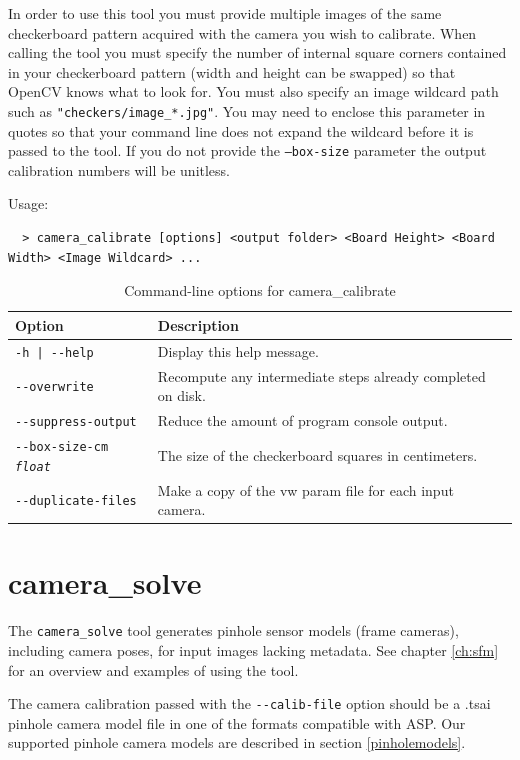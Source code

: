 In order to use this tool you must provide multiple images of the same checkerboard pattern acquired with
the camera you wish to calibrate.  When calling the tool you must specify the number of internal square corners
contained in your checkerboard pattern (width and height can be swapped) so that OpenCV knows what to look for.
You must also specify an image wildcard path such as \texttt{"checkers/image\_*.jpg"}.  You may need to enclose this
parameter in quotes so that your command line does not expand the wildcard before it is passed to the tool.
If you do not provide the \texttt{--box-size} parameter the output calibration numbers will be unitless.

Usage:
\begin{verbatim}
  > camera_calibrate [options] <output folder> <Board Height> <Board Width> <Image Wildcard> ...
\end{verbatim}

\begin{longtable}{|l|p{7.5cm}|}
\caption{Command-line options for camera\_calibrate}
\label{tbl:cameracalibrate}
\endfirsthead
\endhead
\endfoot
\endlastfoot
\hline
Option & Description \\ \hline \hline
\texttt{-h | -\/-help } & Display this help message.\\ \hline
\texttt{-\/-overwrite}  & Recompute any intermediate steps already completed on disk.\\ \hline
\texttt{-\/-suppress-output} & Reduce the amount of program console output.\\ \hline
\texttt{-\/-box-size-cm  \textit{float}} & The size of the checkerboard squares in centimeters.\\ \hline
\texttt{-\/-duplicate-files} & Make a copy of the vw param file for each input camera.\\ \hline
\end{longtable}

\section{camera\_solve}
\label{camerasolve}

The \texttt{camera\_solve} tool generates pinhole sensor models (frame
cameras), including camera poses, for input images lacking metadata.  See chapter
\ref{ch:sfm} for an overview and examples of using the tool.

The camera calibration passed with the \texttt{-\/-calib-file} option
 should be a .tsai pinhole camera model file in one of the formats
compatible with ASP.  Our supported pinhole camera models are described
in section \ref{pinholemodels}.


